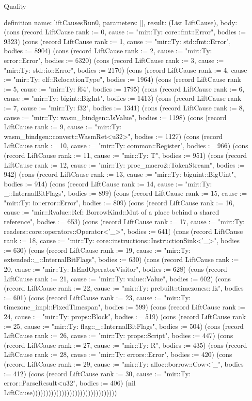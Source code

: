 \begin{lexlean}{Quality}
\begin{semanticmodule}
definition{
  name: liftCausesRun0,
  parameters: [],
  result: (List LiftCause),
  body: (cons (record LiftCause {rank := 0, cause := "mir::Ty: core::fmt::Error", bodies := 9323}) (cons (record LiftCause {rank := 1, cause := "mir::Ty: std::fmt::Error", bodies := 8904}) (cons (record LiftCause {rank := 2, cause := "mir::Ty: error::Error", bodies := 6320}) (cons (record LiftCause {rank := 3, cause := "mir::Ty: std::io::Error", bodies := 2170}) (cons (record LiftCause {rank := 4, cause := "mir::Ty: elf::RelocationType", bodies := 1964}) (cons (record LiftCause {rank := 5, cause := "mir::Ty: f64", bodies := 1795}) (cons (record LiftCause {rank := 6, cause := "mir::Ty: bigint::BigInt", bodies := 1413}) (cons (record LiftCause {rank := 7, cause := "mir::Ty: f32", bodies := 1341}) (cons (record LiftCause {rank := 8, cause := "mir::Ty: wasm_bindgen::JsValue", bodies := 1198}) (cons (record LiftCause {rank := 9, cause := "mir::Ty: wasm_bindgen::convert::WasmRet<u32>", bodies := 1127}) (cons (record LiftCause {rank := 10, cause := "mir::Ty: common::Register", bodies := 966}) (cons (record LiftCause {rank := 11, cause := "mir::Ty: T", bodies := 951}) (cons (record LiftCause {rank := 12, cause := "mir::Ty: proc_macro2::TokenStream", bodies := 942}) (cons (record LiftCause {rank := 13, cause := "mir::Ty: biguint::BigUint", bodies := 914}) (cons (record LiftCause {rank := 14, cause := "mir::Ty: _::InternalBitFlags", bodies := 899}) (cons (record LiftCause {rank := 15, cause := "mir::Ty: io::error::Error", bodies := 809}) (cons (record LiftCause {rank := 16, cause := "mir::Rvalue::Ref: BorrowKind::Mut of a place behind a shared reference", bodies := 653}) (cons (record LiftCause {rank := 17, cause := "mir::Ty: readers::core::operators::Operator<'_>", bodies := 641}) (cons (record LiftCause {rank := 18, cause := "mir::Ty: core::instructions::InstructionSink<'_>", bodies := 630}) (cons (record LiftCause {rank := 19, cause := "mir::Ty: extended::_::InternalBitFlags", bodies := 630}) (cons (record LiftCause {rank := 20, cause := "mir::Ty: IsEndOperatorVisitor", bodies := 628}) (cons (record LiftCause {rank := 21, cause := "mir::Ty: value::Value", bodies := 602}) (cons (record LiftCause {rank := 22, cause := "mir::Ty: prebuilt::timezones::Tz", bodies := 601}) (cons (record LiftCause {rank := 23, cause := "mir::Ty: timezone_impl::FixedTimespan", bodies := 599}) (cons (record LiftCause {rank := 24, cause := "mir::Ty: props::Block", bodies := 519}) (cons (record LiftCause {rank := 25, cause := "mir::Ty: flag::_::InternalBitFlags", bodies := 504}) (cons (record LiftCause {rank := 26, cause := "mir::Ty: props::Script", bodies := 447}) (cons (record LiftCause {rank := 27, cause := "mir::Ty: R", bodies := 435}) (cons (record LiftCause {rank := 28, cause := "mir::Ty: errors::Error", bodies := 420}) (cons (record LiftCause {rank := 29, cause := "mir::Ty: alloc::borrow::Cow<'_", bodies := 412}) (cons (record LiftCause {rank := 30, cause := "mir::Ty: error::ParseResult<u32", bodies := 406}) (nil LiftCause))))))))))))))))))))))))))))))))
}


\end{semanticmodule}
\end{lexlean}

